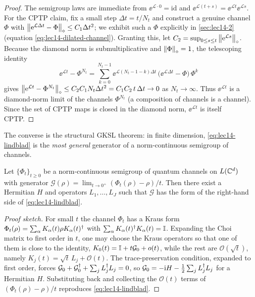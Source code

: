 \begin{proof}
The semigroup laws are immediate from $\ee^{\mathcal L\cdot0}=\mathrm{id}$ and
$\ee^{\mathcal L(t+s)}=\ee^{\mathcal L t}\ee^{\mathcal L s}$. For the CPTP claim, fix a small step
$\Delta t=t/N_t$ and construct a genuine channel $\Phi$ with
$\left\lVert \mathrm{e}^{\mathcal L\Delta t}-\Phi \right\rVert_\diamond\le C_1\Delta t^2$; we exhibit such a $\Phi$
explicitly in \cref{sec:lec14-2} (equation \eqref{eq:lec14-dilated-channel}). Granting this, let
$C_2=\sup_{0\le s\le t}\left\lVert \mathrm{e}^{\mathcal L s} \right\rVert_\diamond$. Because the diamond norm is
submultiplicative and $\left\lVert \Phi \right\rVert_\diamond=1$, the telescoping identity
\[
  \ee^{\mathcal L t}-\Phi^{N_t}
  =\sum_{k=0}^{N_t-1}\ee^{\mathcal L(N_t-1-k)\Delta t}\,
     \bigl(\ee^{\mathcal L\Delta t}-\Phi\bigr)\,\Phi^{k}
\]
gives $\left\lVert \mathrm{e}^{\mathcal L t}-\Phi^{N_t} \right\rVert_\diamond\le C_2 C_1 N_t\Delta t^2=C_1C_2\,t\,\Delta t\to0$
as $N_t\to\infty$. Thus $\ee^{\mathcal L t}$ is a diamond-norm limit of the channels
$\Phi^{N_t}$ (a composition of channels is a channel). Since the set of CPTP maps is closed in the
diamond norm, $\ee^{\mathcal L t}$ is itself CPTP.
\end{proof}

The converse is the structural GKSL theorem: in finite dimension, \eqref{eq:lec14-lindblad} is
the \emph{most general} generator of a norm-continuous semigroup of channels.

\begin{proposition}
\label{prop:lec14-gksl}
Let $\{\Phi_t\}_{t\ge0}$ be a norm-continuous semigroup of quantum channels on $L(\mathbb{C}^d)$ with
generator $\mathcal G(\rho)=\lim_{t\to0^+}(\Phi_t(\rho)-\rho)/t$. Then there exist a Hermitian
$H$ and operators $L_1,\dots,L_J$ such that $\mathcal G$ has the form of the right-hand side of
\eqref{eq:lec14-lindblad}.
\end{proposition}

\begin{proof}[Proof sketch]
For small $t$ the channel $\Phi_t$ has a Kraus form $\Phi_t(\rho)=\sum_\alpha K_\alpha(t)\rho
K_\alpha(t)^{\dagger}$ with $\sum_\alpha K_\alpha(t)^{\dagger} K_\alpha(t)=\mathbb{I}$. Expanding the Choi matrix to
first order in $t$, one may choose the Kraus operators so that one of them is close to the
identity, $K_0(t)=\mathbb{I}+t\mathcal G_0+o(t)$, while the rest are $\mathcal O(\sqrt t)$, namely
$K_j(t)=\sqrt t\,L_j+\mathcal O(t)$. The trace-preservation condition, expanded to first order,
forces $\mathcal G_0+\mathcal G_0^{\dagger}+\sum_{j}L_j^{\dagger} L_j=0$, so $\mathcal G_0=-\mathrm{i} H-\tfrac12
\sum_j L_j^{\dagger} L_j$ for a Hermitian $H$. Substituting back and collecting the $\mathcal O(t)$
terms of $(\Phi_t(\rho)-\rho)/t$ reproduces \eqref{eq:lec14-lindblad}.
\end{proof}

